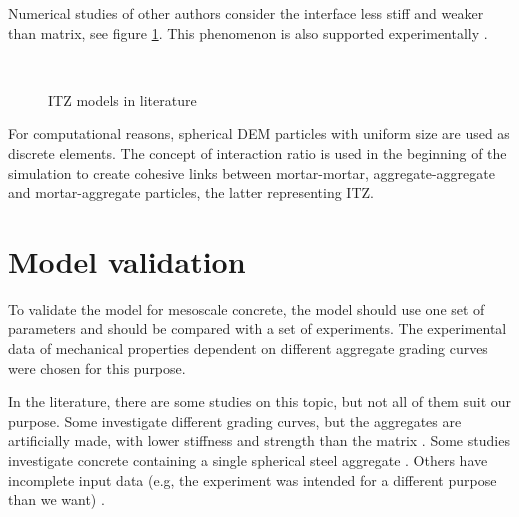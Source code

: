 Numerical studies of other authors \cite{AzevedoLemosAlmeida2008a,KimAlrub2011a,Kozicki2007a,KwanWangChan1999b,GrasslRempling2008a,GuHongWangLin2013a,GrasslJirasek2010a,PradoMier2003a,QinZhang2011a,SnozziGatuingtMolinari2012a,TangZhangShi2008,TreggerCorrGrahambradyShah2006a,YipLiLiaoBolander2006a} consider the interface less stiff and weaker than matrix, see figure \ref{figMCPMITZModelInLiterature}.
This phenomenon is also supported experimentally \cite{TangZhangShi2008}.

\begin{figure}[htbp]
	\centering
	\\
	\caption[ITZ models in literature]{ITZ models in literature \cite{AzevedoLemosAlmeida2008a,KimAlrub2011a,Kozicki2007a,KwanWangChan1999b,GrasslRempling2008a,GuHongWangLin2013a,GrasslJirasek2010a,PradoMier2003a,QinZhang2011a,SnozziGatuingtMolinari2012a,TangZhangShi2008,TreggerCorrGrahambradyShah2006a,YipLiLiaoBolander2006a}}
	\label{figMCPMITZModelInLiterature}
\end{figure}


For computational reasons, spherical DEM particles with uniform size are used as discrete elements.
The concept of interaction ratio is used in the beginning of the simulation to create cohesive links between mortar-mortar, aggregate-aggregate and mortar-aggregate particles, the latter representing ITZ.








\section{Model validation}

To validate the model for mesoscale concrete, the model should use one set of parameters and should be compared with a set of experiments.
The experimental data of mechanical properties dependent on different aggregate grading curves were chosen for this purpose.

In the literature, there are some studies on this topic, but not all of them suit our purpose.
Some investigate different grading curves, but the aggregates are artificially made, with lower stiffness and strength than the matrix \cite{ElicesRocco2008a}.
Some studies investigate concrete containing a single spherical steel aggregate \cite{AkcaogluTokyayCelik2002a,AkcaogluTokyayCelik2004a,AkcaogluTokyayCelik2005a}.
Others have incomplete input data (e.g, the experiment was intended for a different purpose than we want) \cite{GiaccioZerbino1998a,GiaccioZerbinoPonceBatic2008a}.

